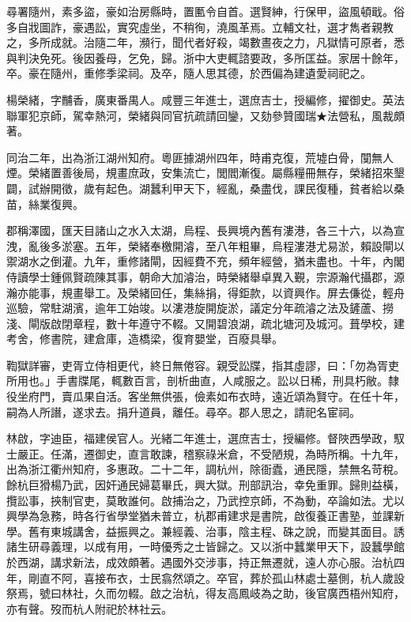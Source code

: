 \begin{pinyinscope}
尋署隨州，素多盜，豪如治房縣時，置匭令自首。選賢紳，行保甲，盜風頓戢。俗多自戕圖詐，豪遇訟，實究虛坐，不稍徇，澆風革焉。立輔文社，選才雋者親教之，多所成就。治隨二年，瀕行，聞代者好殺，竭數晝夜之力，凡獄情可原者，悉與判決免死。後因養母，乞免，歸。浙中大吏輒諮要政，多所匡益。家居十餘年，卒。豪在隨州，重修季梁祠。及卒，隨人思其德，於西偏為建遺愛祠祀之。

楊榮緒，字黼香，廣東番禺人。咸豐三年進士，選庶吉士，授編修，擢御史。英法聯軍犯京師，駕幸熱河，榮緒與同官抗疏請回鑾，又劾參贊國瑞★法營私，風裁頗著。

同治二年，出為浙江湖州知府。粵匪據湖州四年，時甫克復，荒墟白骨，闃無人煙。榮緒置善後局，規畫庶政，安集流亡，閭閻漸復。屬縣糧冊無存，榮緒招來墾闢，試辦開徵，歲有起色。湖蠶利甲天下，經亂，桑盡伐，課民復種，貧者給以桑苗，絲業復興。

郡稱澤國，匯天目諸山之水入太湖，烏程、長興境內舊有漊港，各三十六，以為宣洩，亂後多淤塞。五年，榮緒奉檄開濬，至八年粗畢，烏程漊港尤易淤，賴設閘以禦湖水之倒灌。九年，重修諸閘，因經費不充，頻年經營，猶未盡也。十年，內閣侍讀學士鍾佩賢疏陳其事，朝命大加濬治，時榮緒舉卓異入覲，宗源瀚代攝郡，源瀚亦能事，規畫舉工。及榮緒回任，集絲捐，得鉅款，以資興作。屏去傔從，輕舟巡驗，常駐湖濱，逾年工始竣。以漊港旋開旋淤，議定分年疏濬之法及鏟蘆、撈淺、閘版啟閉章程，數十年遵守不輟。又開碧浪湖，疏北塘河及城河。葺學校，建考舍，修書院，建倉庫，造橋梁，復育嬰堂，百廢具舉。

鞫獄詳審，吏胥立侍相更代，終日無倦容。親受訟牒，指其虛謬，曰：「勿為胥吏所用也。」手書牒尾，輒數百言，剖析曲直，人咸服之。訟以日稀，刑具朽敝。隸役坐府門，賣瓜果自活。客坐無供張，儉素如布衣時，遠近頌為賢守。在任十年，嗣為人所譖，遂求去。捐升道員，離任。尋卒。郡人思之，請祀名宦祠。

林啟，字迪臣，福建侯官人。光緒二年進士，選庶吉士，授編修。督陜西學政，馭士嚴正。任滿，遷御史，直言敢諫，稽察祿米倉，不受陋規，為時所稱。十九年，出為浙江衢州知府，多惠政。二十二年，調杭州，除衙蠹，通民隱，禁無名苛稅。餘杭巨猾楊乃武，因奸通民婦葛畢氏，興大獄。刑部訊治，幸免重罪。歸則益橫，攬訟事，挾制官吏，莫敢誰何。啟捕治之，乃武控京師，不為動，卒論如法。尤以興學為急務，時各行省學堂猶未普立，杭郡甫建求是書院，啟復養正書塾，並課新學。舊有東城講舍，益振興之。兼經義、治事，陰主程、硃之說，而變其面目。誘諸生研尋義理，以成有用，一時優秀之士皆歸之。又以浙中蠶業甲天下，設蠶學館於西湖，講求新法，成效頗著。遇國外交涉事，持正無遷就，遠人亦心服。治杭四年，剛直不阿，喜接布衣，士民翕然頌之。卒官，葬於孤山林處士墓側，杭人歲設祭焉，號曰林社，久而勿輟。啟之治杭，得友高鳳岐為之助，後官廣西梧州知府，亦有聲。歿而杭人附祀於林社云。


\end{pinyinscope}
